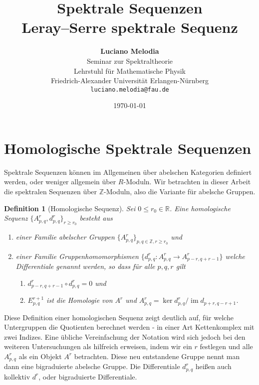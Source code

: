 \documentclass[12pt, hidelinks]{article}
\title{\textbf{Spektrale Sequenzen\\ Leray–Serre spektrale Sequenz}}
\author{
\textbf{Luciano Melodia} \\
Seminar zur Spektraltheorie \\
Lehrstuhl für Mathematische Physik \\
Friedrich-Alexander Universität Erlangen-Nürnberg \\
\texttt{luciano.melodia@fau.de}}
\date{\today}
\numberwithin{conj}{section}
\newtheorem{definition}[conj]{Definition}
\newcommand{\Z}{\mathbb{Z}}
\newcommand{\ima}{\operatorname{im}}
\begin{document}
\hypersetup{bookmarksnumbered=true,}
\maketitle

\begin{Large}
\tableofcontents
\end{Large}

\section{Homologische Spektrale Sequenzen}
Spektrale Sequenzen können im Allgemeinen über abelschen Kategorien definiert werden, oder weniger allgemein über $R$-Moduln. Wir betrachten in dieser Arbeit die spektralen Sequenzen über $\mathbb{Z}$-Moduln, also die Variante für abelsche Gruppen.

\begin{definition}[Homologische Sequenz]
\label{homologischeSequenz}
Sei $0 \leq r_0 \in \mathbb{R}$. Eine homologische Sequenz $\{A^r_{p,q}, d^r_{p,q}\}_{r \geq r_0}$ besteht aus
\begin{enumerate}[nolistsep]
    \item einer Familie abelscher Gruppen $\{A^r_{p,q}\}_{p,q \in \Z, r \geq r_0}$ und
    \item einer Familie Gruppenhomomorphismen $\{d^r_{p,q}: A^r_{p,q} \to A^r_{p-r,q+r-1}\}$ welche Differentiale genannt werden, so dass für alle $p,q,r$ gilt
    \begin{enumerate}[nolistsep]
        \item $d^r_{p-r,q+r-1} \circ d^r_{p,q} = 0$ und
        \item $E^{r+1}_{p,q}$ ist die Homologie von $A^r$ und $A^r_{p,q} = \ker d^r_{p,q} / \ima d_{p+r,q-r+1}$.
    \end{enumerate}
\end{enumerate}
\end{definition}

Diese Definition einer homologischen Sequenz zeigt deutlich auf, für welche Untergruppen die Quotienten berechnet werden - in einer Art Kettenkomplex mit zwei Indizes. Eine übliche Vereinfachung der Notation wird sich jedoch bei den weiteren Untersuchungen als hilfreich erweisen, indem wir ein $r$ festlegen und alle $A^r_{p,q}$ als ein Objekt $A^r$ betrachten. Diese neu entstandene Gruppe nennt man dann eine bigraduierte abelsche Gruppe. Die Differentiale $d^r_{p,q}$ heißen auch kollektiv $d^r$, oder bigraduierte Differentiale.
\end{document}
